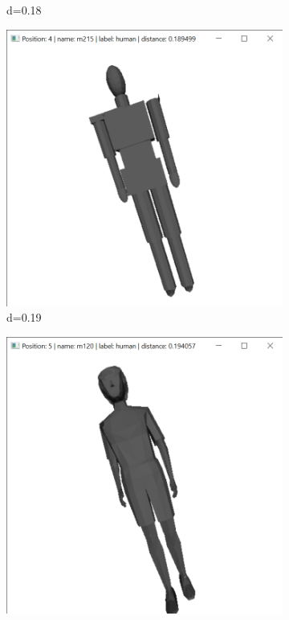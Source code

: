 \documentclass{bigdata}
\begin{document}
\begin{figure}[h!]
\begin{subfigure}[b]{0.09\linewidth}
    \caption*{d=0.18}
  \end{subfigure}
  \begin{subfigure}[b]{0.09\linewidth}
    \includegraphics[width=\linewidth]{Pictures/Evaluation/m134/pos4.png}
    \caption*{d=0.19}
  \end{subfigure}
  \begin{subfigure}[b]{0.09\linewidth}
    \includegraphics[width=\linewidth]{Pictures/Evaluation/m134/pos5.png}

\end{subfigure}
\end{figure}
\end{document}
